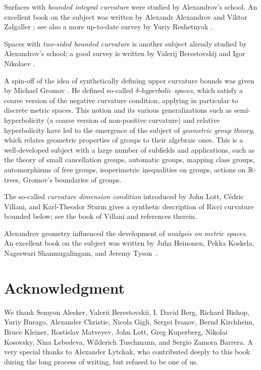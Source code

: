 Surfaces with {}\emph{bounded integral curvature} were studied by Alexandrov's school.
An excellent book on the subject was written by Alexandr Alexandrov and Viktor Zalgaller \cite{aleksandrov-zalgaller}; see also a more up-to-date survey by Yuriy Reshetnyak \cite{reshetnyak:2D}.

Spaces with {}\emph{two-sided bounded curvature} is another subject already studied  by Alexandrov's school;
a good survey is written by Valerij Berestovskij and Igor Nikolaev \cite{berestovskii-nikolaev}.

A spin-off of the idea of synthetically defining upper curvature bounds 
was given by Michael Gromov \cite{gromov:hyp-groups}. 
He  defined so-called  {}\emph{$\delta$-hyperbolic spaces}, which satisfy   a coarse version of the  negative curvature condition, applying  in particular to discrete metric spaces.
This notion and its various generalizations such as semi-hyperbolicity (a coarse version of non-positive curvature) and relative hyperbolicity have  led to the emergence of the subject of {}\emph{geometric group theory}, which relates geometric properties of groups to their algebraic ones.
This is a well-developed subject with a large number of subfields and applications, such as the theory of small cancellation groups, automatic groups,  mapping class groups, automorphisms of free groups, isoperimetric inequalities on groups, actions on $\mathbb{R}$-trees, Gromov's boundaries of groups.

{\sloppy

The so-called {}\emph{curvature dimension condition} introduced by John Lott, C\'edric Villani, and Karl-Theodor Sturm gives a synthetic description of Ricci curvature bounded below; see the book of Villani \cite{villani} and references therein.

Alexandrov geometry influenced the development of {}\emph{analysis on metric spaces}. 
An excellent book on the subject was written by Juha Heinonen, Pekka Koskela, Nageswari Shanmugalingam, and Jeremy Tyson~\cite{heinonen-koskela-shanmugalingam-tyson}.

}

\section*{Acknowledgment}
We thank 
Semyon Alesker,
Valerii Berestovskii,
I. David Berg,
Richard Bishop, 
Yuriy Burago, 
Alexander Christie,
Nicola Gigli,
Sergei Ivanov,
Bernd Kirchheim, 
Bruce Kleiner, 
Rostislav Matveyev,
John Lott, 
Greg Kuperberg, 
Nikolai Kosovsky, 
Nina Lebedeva,
Wilderich Tuschmann, 
and
Sergio Zamora Barrera.
A very special thanks to Alexander Lytchak, who contributed deeply to this book during the long process of writing, but refused to be one of us.

